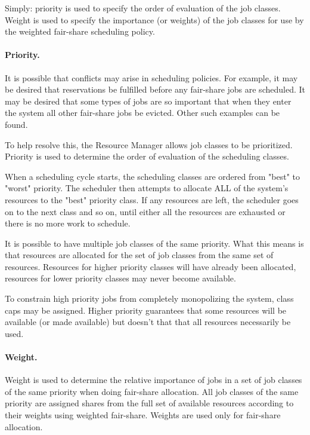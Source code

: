     Simply: priority is used to specify the order of evaluation of the job classes. Weight is used
    to specify the importance (or weights) of the job classes for use by the weighted fair-share
    scheduling policy.

    \paragraph{Priority.} It is possible that conflicts may arise in scheduling policies. For example, it may be
    desired that reservations be fulfilled before any fair-share jobs are scheduled. It may be
    desired that some types of jobs are so important that when they enter the system all other
    fair-share jobs be evicted. Other such examples can be found.
    
    To help resolve this, the Resource Manager allows job classes to be prioritized. Priority is
    used to determine the order of evaluation of the scheduling classes.
    
    When a scheduling cycle starts, the scheduling classes are ordered from "best" to "worst" priority. 
    The scheduler then attempts to allocate ALL of the system's resources to the "best" priority class. 
    If any resources are left, the scheduler goes on to the next class and so on, until either all the 
    resources are exhausted or there is no more work to schedule. 
    
    It is possible to have multiple job classes of the same priority. What this means is that resources 
    are allocated for the set of job classes from the same set of resources. Resources for higher priority 
    classes will have already been allocated, resources for lower priority classes may never become 
    available. 
    
    To constrain high priority jobs from completely monopolizing the system, class caps may be 
    assigned. Higher priority guarantees that some resources will be available (or made available) but 
    doesn't that that all resources necessarily be used. 

    \paragraph{Weight.} Weight is used to determine the relative importance of jobs in a set of job classes of 
    the same priority when doing fair-share allocation. All job classes of the same priority are assigned 
    shares from the full set of available resources according to their weights using weighted fair-share. 
    Weights are used only for fair-share allocation. 
    
